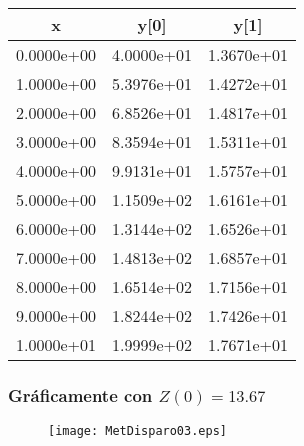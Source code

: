 \begin{frame}
\fontsize{12}{12}\selectfont
\begin{center}
\begin{tabular}{c | c | c}
x & y[0] & y[1] \\ \hline 
0.0000e+00 & 4.0000e+01 & 1.3670e+01 \\
1.0000e+00 & 5.3976e+01 & 1.4272e+01 \\
2.0000e+00 & 6.8526e+01 & 1.4817e+01 \\
3.0000e+00 & 8.3594e+01 & 1.5311e+01 \\
4.0000e+00 & 9.9131e+01 & 1.5757e+01 \\
5.0000e+00 & 1.1509e+02 & 1.6161e+01 \\
6.0000e+00 & 1.3144e+02 & 1.6526e+01 \\
7.0000e+00 & 1.4813e+02 & 1.6857e+01 \\
8.0000e+00 & 1.6514e+02 & 1.7156e+01 \\
9.0000e+00 & 1.8244e+02 & 1.7426e+01 \\
1.0000e+01 & 1.9999e+02 & 1.7671e+01
\end{tabular}
\end{center}
\end{frame}
\begin{frame}
\frametitle{Gr\'{a}ficamente con $Z(0)= 13.67$}
\begin{figure}
	\centering
	\texttt{[image: MetDisparo03.eps]} 
\end{figure}
\end{frame}

